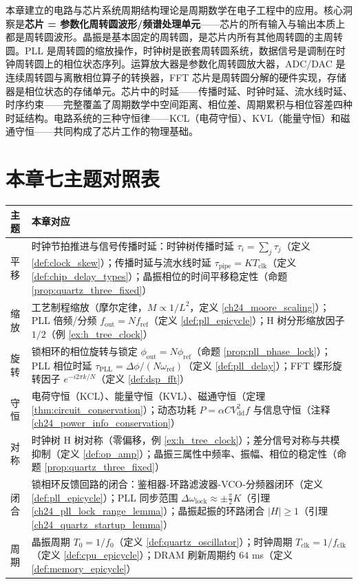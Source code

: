 \begin{remark}[与全书的衔接]
本章建立的电路与芯片系统周期结构理论是周期数学在电子工程中的应用。核心洞察是\textbf{芯片 = 参数化周转圆波形/频谱处理单元}——芯片的所有输入与输出本质上都是周转圆波形。晶振是基本固定的周转圆，是芯片内所有其他周转圆的主周转圆。PLL 是周转圆的缩放操作，时钟树是嵌套周转圆系统，数据信号是调制在时钟周转圆上的相位状态序列。运算放大器是参数化周转圆放大器，ADC/DAC 是连续周转圆与离散相位算子的转换器，FFT 芯片是周转圆分解的硬件实现，存储器是相位状态的存储单元。芯片中的时延——传播时延、时钟时延、流水线时延、时序约束——完整覆盖了周期数学中空间距离、相位差、周期累积与相位容差四种时延结构。电路系统的三种守恒律——KCL（电荷守恒）、KVL（能量守恒）和磁通守恒——共同构成了芯片工作的物理基础。
\end{remark}

\section*{本章七主题对照表}

\begin{center}
\begin{tabular}{>{\centering\arraybackslash}p{2.2cm}>{\centering\arraybackslash}p{10.5cm}}
\toprule
主题 & 本章对应 \\
\midrule
平移 & 时钟节拍推进与信号传播时延：时钟树传播时延 $\tau_i = \sum_{j}\tau_j$（定义 \ref{def:clock_skew}）；传播时延与流水线时延 $\tau_{\text{pipe}} = K T_{\text{clk}}$（定义 \ref{def:chip_delay_types}）；晶振相位的时间平移稳定性（命题 \ref{prop:quartz_three_fixed}） \\
缩放 & 工艺制程缩放（摩尔定律，$M\propto 1/L^2$，定义 \ref{ch24_moore_scaling}）；PLL 倍频/分频 $f_{\text{out}} = N f_{\text{ref}}$（定义 \ref{def:pll_epicycle}）；H 树分形缩放因子 $1/2$（例 \ref{ex:h_tree_clock}） \\
旋转 & 锁相环的相位旋转与锁定 $\phi_{\text{out}} = N\phi_{\text{ref}}$（命题 \ref{prop:pll_phase_lock}）；PLL 相位时延 $\tau_{\text{PLL}} = \Delta\phi/(N\omega_{\text{ref}})$（定义 \ref{def:pll_delay}）；FFT 蝶形旋转因子 $e^{-i2\pi k/N}$（定义 \ref{def:dsp_fft}） \\
守恒 & 电荷守恒（KCL）、能量守恒（KVL）、磁通守恒（定理 \ref{thm:circuit_conservation}）；动态功耗 $P = \alpha C V_{\text{dd}}^2 f$ 与信息守恒（注释 \ref{ch24_power_info_conservation}） \\
对称 & 时钟树 H 树对称（零偏移，例 \ref{ex:h_tree_clock}）；差分信号对称与共模抑制（定义 \ref{def:op_amp}）；晶振三属性中频率、振幅、相位的稳定性（命题 \ref{prop:quartz_three_fixed}） \\
闭合 & 锁相环反馈回路的闭合：鉴相器-环路滤波器-VCO-分频器闭环（定义 \ref{def:pll_epicycle}）；PLL 同步范围 $\Delta\omega_{\text{lock}} \approx \pm\frac{\pi}{2}K$（引理 \ref{ch24_pll_lock_range_lemma}）；晶振起振的环路闭合 $|H|\ge 1$（引理 \ref{ch24_quartz_startup_lemma}） \\
周期 & 晶振周期 $T_0 = 1/f_0$（定义 \ref{def:quartz_oscillator}）；时钟周期 $T_{\text{clk}} = 1/f_{\text{clk}}$（定义 \ref{def:cpu_epicycle}）；DRAM 刷新周期约 $64$ ms（定义 \ref{def:memory_epicycle}） \\
\bottomrule
\end{tabular}
\end{center}

